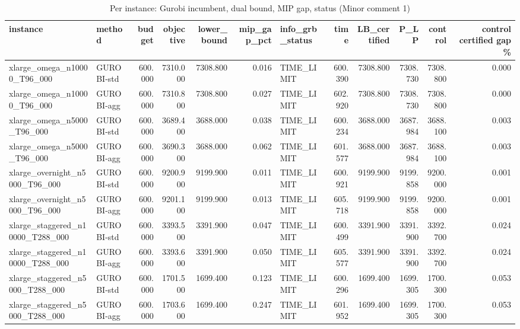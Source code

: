 \begin{table}[htbp]
\centering
\small
\caption{Per instance: Gurobi incumbent, dual bound, MIP gap, status (Minor comment 1)}
\label{tab:E3x_long_runs_xlarge_gurobi_per_instance}
\begin{tabular}{llrrrrlrrrrr}
\toprule
instance & method & budget & objective & lower\_bound & mip\_gap\_pct & info\_grb\_status & time & LB\_certified & P\_LP & control & control certified gap \% \\
\midrule
xlarge\_omega\_n10000\_T96\_000 & GUROBI-std & 600.000 & 7310.000 & 7308.800 & 0.016 & TIME\_LIMIT & 600.390 & 7308.800 & 7308.730 & 7308.800 & 0.000 \\
xlarge\_omega\_n10000\_T96\_000 & GUROBI-agg & 600.000 & 7310.800 & 7308.800 & 0.027 & TIME\_LIMIT & 602.920 & 7308.800 & 7308.730 & 7308.800 & 0.000 \\
xlarge\_omega\_n5000\_T96\_000 & GUROBI-std & 600.000 & 3689.400 & 3688.000 & 0.038 & TIME\_LIMIT & 600.234 & 3688.000 & 3687.984 & 3688.100 & 0.003 \\
xlarge\_omega\_n5000\_T96\_000 & GUROBI-agg & 600.000 & 3690.300 & 3688.000 & 0.062 & TIME\_LIMIT & 601.577 & 3688.000 & 3687.984 & 3688.100 & 0.003 \\
xlarge\_overnight\_n5000\_T96\_000 & GUROBI-std & 600.000 & 9200.900 & 9199.900 & 0.011 & TIME\_LIMIT & 600.921 & 9199.900 & 9199.858 & 9200.000 & 0.001 \\
xlarge\_overnight\_n5000\_T96\_000 & GUROBI-agg & 600.000 & 9201.100 & 9199.900 & 0.013 & TIME\_LIMIT & 605.718 & 9199.900 & 9199.858 & 9200.000 & 0.001 \\
xlarge\_staggered\_n10000\_T288\_000 & GUROBI-std & 600.000 & 3393.500 & 3391.900 & 0.047 & TIME\_LIMIT & 600.499 & 3391.900 & 3391.900 & 3392.700 & 0.024 \\
xlarge\_staggered\_n10000\_T288\_000 & GUROBI-agg & 600.000 & 3393.600 & 3391.900 & 0.050 & TIME\_LIMIT & 605.577 & 3391.900 & 3391.900 & 3392.700 & 0.024 \\
xlarge\_staggered\_n5000\_T288\_000 & GUROBI-std & 600.000 & 1701.500 & 1699.400 & 0.123 & TIME\_LIMIT & 600.296 & 1699.400 & 1699.305 & 1700.300 & 0.053 \\
xlarge\_staggered\_n5000\_T288\_000 & GUROBI-agg & 600.000 & 1703.600 & 1699.400 & 0.247 & TIME\_LIMIT & 601.952 & 1699.400 & 1699.305 & 1700.300 & 0.053 \\
\bottomrule
\end{tabular}
\end{table}
